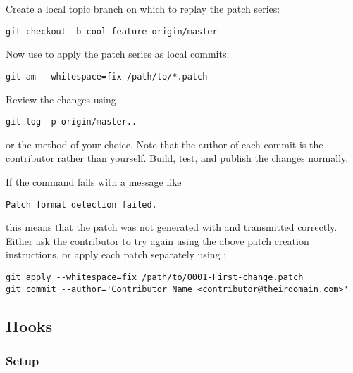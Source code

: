 Create a local topic branch on which to replay the patch series:

\begin{verbatim}
git checkout -b cool-feature origin/master
\end{verbatim}

Now use  to apply the patch series as local commits:

\begin{verbatim}
git am --whitespace=fix /path/to/*.patch
\end{verbatim}

Review the changes using

\begin{verbatim}
git log -p origin/master..
\end{verbatim}

or the method of your choice. Note that the author of each commit is the
contributor rather than yourself. Build, test, and publish the changes normally.

If the  command fails with a message like

\begin{verbatim}
Patch format detection failed.
\end{verbatim}

this means that the patch was not generated with  and
transmitted correctly. Either ask the contributor to try again using the above
patch creation instructions, or apply each patch separately using
:

\begin{verbatim}
git apply --whitespace=fix /path/to/0001-First-change.patch
git commit --author='Contributor Name <contributor@theirdomain.com>'
\end{verbatim}


\subsection{Hooks}
\label{subsec:Hooks}

\subsubsection{Setup}
\label{subsubsec:Setup}

